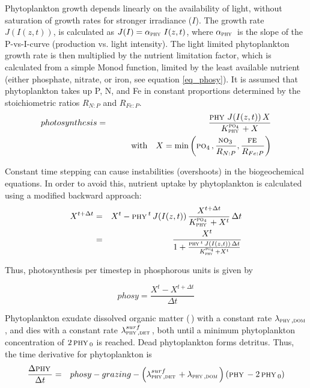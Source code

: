 \documentclass[11pt,a4paper,fleqn,twoside]{article}
\def\pho{\text{\textsc{po$_4$}}\,}
\def\nit{\text{\textsc{no$_3$}}\,}
\def\dom{\text{\textsc{dom}}\,}
\def\phy{\text{\textsc{phy}}\,}
\def\det{\text{\textsc{det}}\,}
\def\fe{\text{\textsc{fe}}\,}
\begin{document}
Phytoplankton growth depends linearly on the availability
of light, without saturation of growth rates for stronger
irradiance ($I$). The growth rate $J(I(z,t))$,
is calculated  as $J(I) = \alpha_\phy \, I(z,t)$, where $\alpha_\phy$ is the
slope of the P-vs-I-curve (production vs. light intensity). 
The light limited phytoplankton growth rate is then multiplied by the
nutrient limitation factor, which is calculated from a simple Monod function, 
limited by the least available nutrient (either phosphate, nitrate, or iron,  see equation
\ref{eq_phosy}). It is assumed that phytoplankton takes up P, N, and Fe
in constant proportions determined by the stoichiometric ratios $R_{N:P}$ and
$R_{Fe:P}$.
\begin{eqnarray}
\label{eq_phosy}
photosynthesis & = & \frac{\phy \, J(I(z,t)) \, X}
{K_{\phy}^{\pho} + X} \\
& & \qquad \mbox{with}
\quad X = \min\left(\pho,\frac{\nit}{R_{N:P}},\frac{\fe}{R_{Fe:P}}\right)
\nonumber
\end{eqnarray}

Constant time stepping can cause instabilities (overshoots) in the
biogeochemical equations. In order to avoid this, nutrient uptake by
phytoplankton is calculated using a modified backward approach:
\begin{eqnarray}
X^{t+\Delta t} & = & X^t - \phy^t \, J(I(z,t)) \, \frac {X^{t+\Delta t}}
{K_{\phy}^{\pho} + X^t} \, \Delta t\\ \nonumber
& = & \frac{X^t}{1+\frac{\phy^t \, J(I(z,t)) \,\Delta t}
{K_{\phy}^{\pho} +X^t}} \nonumber 
\end{eqnarray}

Thus, photosynthesis per timestep in phosphorous units is given by

\begin{equation*}
phosy  =  \frac{X^t - X^{t+\Delta t}}{\Delta t}
\end{equation*}

Phytoplankton exudate dissolved organic matter (\dom) with a constant rate
$\lambda_{\phy,\dom}$, and dies with a constant rate
$\lambda_{\phy,\det}^{surf}$, both until a minimum phytoplankton concentration
of  $2\, \phy_0$ is reached. Dead phytoplankton forms detritus. Thus, the time derivative
for phytoplankton is 
\begin{eqnarray}
\label{eq_phy_sur}
\frac{\Delta\phy}{\Delta t} & = & phosy - grazing -
\left(\lambda_{\phy,\det}^{surf}+\lambda_{\phy,\dom}\right) 
\left( \phy - 2 \,\phy_0 \right)
\end{eqnarray}
\end{document}
